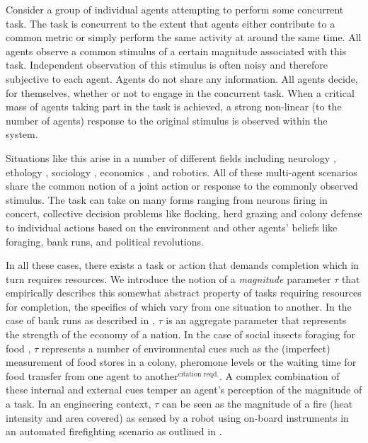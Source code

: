 \documentclass{nature}
\def\citerq{$^\text{citation reqd.}$}
\begin{document}
Consider a group of individual agents attempting to perform some concurrent task. The task is concurrent to the extent that agents either contribute to a common metric or simply perform the same activity at around the same time. All agents observe a common stimulus of a certain magnitude associated with this task. Independent observation of this stimulus is often noisy and therefore subjective to each agent. Agents do not share any information. All agents decide, for themselves, whether or not to engage in the concurrent task. When a critical mass of agents taking part in the task is achieved, a strong non-linear (to the number of agents) response to the original stimulus is observed within the system.

Situations like this arise in a number of different fields including neurology \cite{Yoshida2010, Suzuki2015}, ethology \cite{Robinson1987, Gordon1996, Bonabeau1998, Theraulaz1998}, sociology \cite{Raafat2009}, economics \cite{Morris2000}, and robotics\cite{Martinoli1999, Krieger2000, Kube2000, Pynadath2002, Gerkey2003, Mataric2003, Gerkey2004, Kanakia2014}. All of these multi-agent scenarios share the common notion of a joint action or response to the commonly observed stimulus. The task can take on many forms ranging from neurons firing in concert, collective decision problems like flocking, herd grazing and colony defense to individual actions based on the environment and other agents' beliefs like foraging, bank runs, and political revolutions. 

In all these cases, there exists a task or action that demands completion which in turn requires resources. We introduce the notion of a \emph{magnitude} parameter $\tau$ that empirically describes this somewhat abstract property of tasks requiring resources for completion, the specifics of which vary from one situation to another. In the case of bank runs as described in \cite{Morris2000}, $\tau$ is an aggregate parameter that represents the strength of the economy of a nation. In the case of social insects foraging for food \cite{Bonabeau1996, Theraulaz1998, Krieger2000}, $\tau$ represents a number of environmental cues such as the (imperfect) measurement of food stores in a colony, pheromone levels \cite{Robinson1987} or the waiting time for food transfer from one agent to another\citerq. A complex combination of these internal and external cues \cite{Gordon1996} temper an agent's perception of the magnitude of a task. In an engineering context, $\tau$ can be seen as the magnitude of a fire (heat intensity and area covered) as sensed by a robot using on-board instruments in an automated firefighting scenario as outlined in \cite{Kanakia2014}. 
\end{document}
